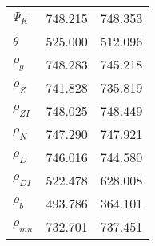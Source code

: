 \begin{center}
\begin{longtable}{lcc}
$ {\Psi_{K}}           $	 & 	     748.215	 & 	     748.353 \\ 
$ {\theta}             $	 & 	     525.000	 & 	     512.096 \\ 
$ {\rho_g}             $	 & 	     748.283	 & 	     745.218 \\ 
$ {\rho_Z}             $	 & 	     741.828	 & 	     735.819 \\ 
$ {\rho_{ZI}}          $	 & 	     748.025	 & 	     748.449 \\ 
$ {\rho_N}             $	 & 	     747.290	 & 	     747.921 \\ 
$ {\rho_D}             $	 & 	     746.016	 & 	     744.580 \\ 
$ {\rho_{DI}}          $	 & 	     522.478	 & 	     628.008 \\ 
$ {\rho_b}             $	 & 	     493.786	 & 	     364.101 \\ 
$ {\rho_{mu}}          $	 & 	     732.701	 & 	     737.451 \\ 
\end{longtable}
 \end{center}
